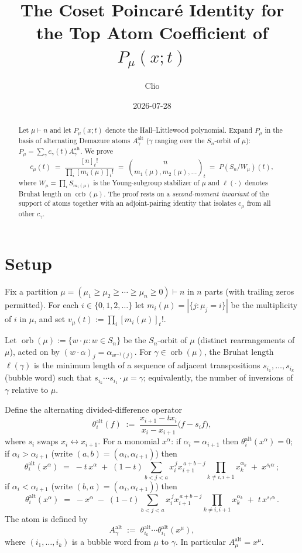 \documentclass[11pt]{article}
\title{The Coset Poincar\'e Identity for the Top Atom Coefficient of $P_\mu(x;t)$}
\author{Clio}
\date{2026-07-28}
\theoremstyle{definition}
\theoremstyle{remark}
\newcommand{\orb}{\operatorname{orb}}
\newcommand{\Aalt}{A^{\mathrm{alt}}}
\newcommand{\thetaalt}{\theta^{\mathrm{alt}}}
\begin{document}
\maketitle

\begin{abstract}
Let $\mu \vdash n$ and let $P_\mu(x;t)$ denote the Hall--Littlewood polynomial.
Expand $P_\mu$ in the basis of alternating Demazure atoms $\Aalt_\gamma$ ($\gamma$
ranging over the $S_n$-orbit of $\mu$):
$P_\mu = \sum_\gamma c_\gamma(t)\Aalt_\gamma$.
We prove
\[
  c_\mu(t) \;=\; \frac{[n]_t!}{\prod_i [m_i(\mu)]_t!}
             \;=\; \binom{n}{m_1(\mu),m_2(\mu),\ldots}_t
             \;=\; P(S_n/W_\mu)(t),
\]
where $W_\mu = \prod_i S_{m_i(\mu)}$ is the Young-subgroup stabilizer of $\mu$
and $\ell(\cdot)$ denotes Bruhat length on $\orb(\mu)$.
The proof rests on a \emph{second-moment invariant} of the support of atoms
together with an adjoint-pairing identity that isolates $c_\mu$ from all other
$c_\gamma$.
\end{abstract}

\section{Setup}

Fix a partition $\mu = (\mu_1 \ge \mu_2 \ge \cdots \ge \mu_n \ge 0) \vdash n$
in $n$ parts (with trailing zeros permitted).
For each $i \in \{0,1,2,\ldots\}$ let $m_i(\mu) = |\{j : \mu_j = i\}|$ be the
multiplicity of $i$ in $\mu$, and set $v_\mu(t) := \prod_i [m_i(\mu)]_t!$.

Let $\orb(\mu) := \{w \cdot \mu : w \in S_n\}$ be the $S_n$-orbit of $\mu$
(distinct rearrangements of $\mu$), acted on by
$(w \cdot \alpha)_j = \alpha_{w^{-1}(j)}$. For $\gamma \in \orb(\mu)$, the
Bruhat length $\ell(\gamma)$ is the minimum length of a sequence of adjacent
transpositions $s_{i_1},\ldots,s_{i_k}$ (bubble word) such that
$s_{i_k} \cdots s_{i_1} \cdot \mu = \gamma$; equivalently, the number of
inversions of $\gamma$ relative to $\mu$.

Define the alternating divided-difference operator
\[
  \thetaalt_i(f) \;:=\; \frac{x_{i+1} - t x_i}{x_i - x_{i+1}}\bigl(f - s_i f\bigr),
\]
where $s_i$ swaps $x_i \leftrightarrow x_{i+1}$. For a monomial $x^\alpha$:
if $\alpha_i = \alpha_{i+1}$ then $\thetaalt_i(x^\alpha) = 0$; if
$\alpha_i > \alpha_{i+1}$ (write $(a,b) = (\alpha_i,\alpha_{i+1})$) then
\begin{equation}\label{eq:theta-descent}
  \thetaalt_i(x^\alpha) \;=\; -t\,x^\alpha \;+\; (1-t)\sum_{b<j<a} x_i^{\,j} x_{i+1}^{\,a+b-j}\prod_{k \ne i,i+1} x_k^{\alpha_k} \;+\; x^{s_i\alpha}\,;
\end{equation}
if $\alpha_i < \alpha_{i+1}$ (write $(b,a) = (\alpha_i,\alpha_{i+1})$) then
\begin{equation}\label{eq:theta-ascent}
  \thetaalt_i(x^\alpha) \;=\; -x^\alpha \;-\; (1-t)\sum_{b<j<a} x_i^{\,j} x_{i+1}^{\,a+b-j}\prod_{k \ne i,i+1} x_k^{\alpha_k} \;+\; t\,x^{s_i\alpha}\,.
\end{equation}
The atom is defined by
\[
  \Aalt_\gamma \;:=\; \thetaalt_{i_k}\cdots\thetaalt_{i_1}(x^\mu),
\]
where $(i_1,\ldots,i_k)$ is a bubble word from $\mu$ to $\gamma$. In particular
$\Aalt_\mu = x^\mu$.
\end{document}
